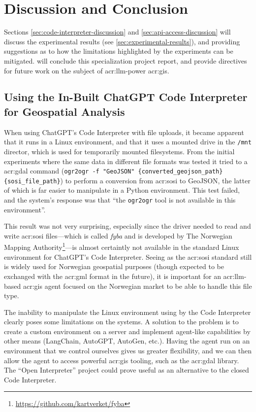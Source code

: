 \chapter{Discussion and Conclusion}\label{cha:discussion-and-conclusion}

Sections \autoref{sec:code-interpreter-discussion} and \autoref{sec:api-access-discussion} will discuss the experimental results (see \autoref{sec:experimental-results}), and providing suggestions as to how the limitations highlighted by the experiments can be mitigated.  will conclude this specialization project report, and provide directives for future work on the subject of \acrshort{acr:llm}-power \acrshort{acr:gis}.

\section{Using the In-Built ChatGPT Code Interpreter for Geospatial Analysis}\label{sec:code-interpreter-discussion}

When using ChatGPT's Code Interpreter with file uploads, it became apparent that it runs in a Linux environment, and that it uses a mounted drive  in the \texttt{/mnt} director, which is used for temporarily mounted filesystems. From the initial experiments where the same data in different file formats was tested it tried to a \acrshort{acr:gdal} command (\texttt{ogr2ogr -f "GeoJSON" \{converted\_geojson\_path\} \{sosi\_file\_path\}}) to perform a conversion from \acrshort{acr:sosi} to GeoJSON, the latter of which is far easier to manipulate in a Python environment. This test failed, and the system's response was that \enquote{the \texttt{ogr2ogr} tool is not available in this environment}.

This result was not very surprising, especially since the driver needed to read and write \acrshort{acr:sosi} files---which is called \textit{fyba} and is developed by The Norwegian Mapping Authority\footnote{\url{https://github.com/kartverket/fyba}}---is almost certaintly not available in the standard Linux environment for ChatGPT's Code Interpreter. Seeing as the \acrshort{acr:sosi} standard still is widely used for Norwegian geospatial purposes (though expected to be exchanged with the \acrshort{acr:gml} format in the future), it is important for an \acrshort{acr:llm}-based \acrshort{acr:gis} agent focused on the Norwegian market to be able to handle this file type.

The inability to manipulate the Linux environment using by the Code Interpreter clearly poses some limitations on the systems. A solution to the problem is to create a custom environment on a server and implement agent-like capabilities by other means (LangChain, AutoGPT, AutoGen, etc.). Having the agent run on an environment that we control ourselves gives us greater flexibility, and we can then allow the agent to access powerful \acrshort{acr:gis} tooling, such as the \acrshort{acr:gdal} library. The \enquote{Open Interpreter} project \citep{killianlucasKillianLucasOpeninterpreter2023} could prove useful as an alternative to the closed Code Interpreter.

